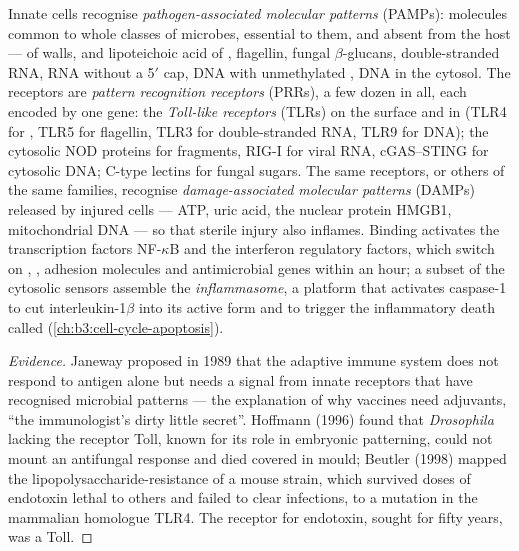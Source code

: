 \begin{definition}\label{def:b3:innate-immunity:prr}
Innate cells recognise \emph{pathogen-associated molecular patterns}
(PAMPs): molecules common to whole classes of microbes, essential to
them, and absent from the host ---  of 
walls,  and lipoteichoic acid of ,
flagellin, fungal $\beta$-glucans, double-stranded RNA, RNA without a
5$'$ cap, DNA with unmethylated , DNA in the cytosol. The receptors
are \emph{pattern recognition receptors} (PRRs), a few dozen in all,
each encoded by one gene: the \emph{Toll-like receptors} (TLRs) on the
surface and in  (TLR4 for , TLR5 for
flagellin, TLR3 for double-stranded RNA, TLR9 for  DNA); the
cytosolic NOD proteins for  fragments, RIG-I for viral
RNA, cGAS--STING for cytosolic DNA; C-type lectins for fungal sugars.
The same receptors, or others of the same families, recognise
\emph{damage-associated molecular patterns} (DAMPs) released by injured
cells --- ATP, uric acid, the nuclear protein HMGB1, mitochondrial DNA
--- so that sterile injury also inflames. Binding activates the
transcription factors NF-$\kappa$B and the interferon regulatory
factors, which switch on , , adhesion molecules and
antimicrobial genes within an hour; a subset of the cytosolic sensors
assemble the \emph{inflammasome}, a platform that activates caspase-1
to cut interleukin-1$\beta$ into its active form and to trigger the
inflammatory death called  (\cref{ch:b3:cell-cycle-apoptosis}).
\end{definition}

\begin{proof}[Evidence]
Janeway proposed in 1989 that the adaptive immune system does not
respond to antigen alone but needs a signal from innate receptors that
have recognised microbial patterns --- the explanation of why vaccines
need adjuvants, ``the immunologist's dirty little secret''. Hoffmann
(1996) found that \emph{Drosophila} lacking the receptor Toll, known
for its role in embryonic patterning, could not mount an antifungal
response and died covered in mould; Beutler (1998) mapped the
lipopolysaccharide-resistance of a mouse strain, which survived doses
of endotoxin lethal to others and failed to clear 
infections, to a mutation in the mammalian homologue TLR4. The receptor
for endotoxin, sought for fifty years, was a Toll.
\end{proof}

